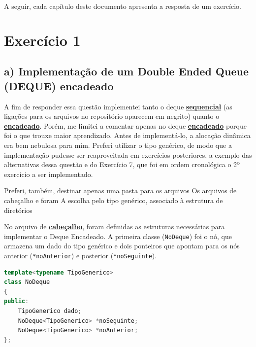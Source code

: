 \documentclass[
  brazilian,
  paper=a4,
  oneside  ,captions=tableheading
]{scrbook}
\newcommand{\passthrough}[1]{#1}
\begin{document}
A seguir, cada capítulo deste documento apresenta a resposta de um
exercício.

\hypertarget{exercuxedcio-1}{%
\chapter{Exercício 1}\label{exercuxedcio-1}}

\hypertarget{a-implementauxe7uxe3o-de-um-double-ended-queue-deque-encadeado}{%
\section{a) Implementação de um Double Ended Queue (DEQUE)
encadeado}\label{a-implementauxe7uxe3o-de-um-double-ended-queue-deque-encadeado}}

A fim de responder essa questão implementei tanto o deque
\href{https://github.com/ecostadelle/lista_pilhas_filas/blob/main/include/dequeSequencial.hpp}{\textbf{sequencial}}
(as ligações para os arquivos no repositório aparecem em negrito) quanto
o
\href{https://github.com/ecostadelle/lista_pilhas_filas/blob/main/include/dequeEncadeado.hpp}{\textbf{encadeado}}.
Porém, me limitei a comentar apenas no deque
\href{https://github.com/ecostadelle/lista_pilhas_filas/blob/main/include/dequeEncadeado.hpp}{\textbf{encadeado}}
porque foi o que trouxe maior aprendizado. Antes de implementá-lo, a
alocação dinâmica era bem nebulosa para mim. Preferi utilizar o tipo
genérico, de modo que a implementação pudesse ser reaproveitada em
exercícios posteriores, a exemplo das alternativas dessa questão e do
Exercício 7, que foi em ordem cronológica o 2º exercício a ser
implementado.

Preferi, também, destinar apenas uma pasta para os arquivos Os arquivos
de cabeçalho e foram A escolha pelo tipo genérico, associado à estrutura
de diretórios

No arquivo de
\href{https://github.com/ecostadelle/lista_pilhas_filas/blob/main/include/dequeEncadeado.hpp}{\textbf{cabeçalho}},
foram definidas as estruturas necessárias para implementar o Deque
Encadeado. A primeira classe (\passthrough{\lstinline!NoDeque!}) foi o
nó, que armazena um dado do tipo genérico e dois ponteiros que apontam
para os nós anterior (\passthrough{\lstinline!*noAnterior!}) e posterior
(\passthrough{\lstinline!*noSeguinte!}).

\begin{lstlisting}[language={C++}]
template<typename TipoGenerico>
class NoDeque 
{
public:
    TipoGenerico dado;
    NoDeque<TipoGenerico> *noSeguinte; 
    NoDeque<TipoGenerico> *noAnterior;
};                 
\end{lstlisting}
\end{document}
